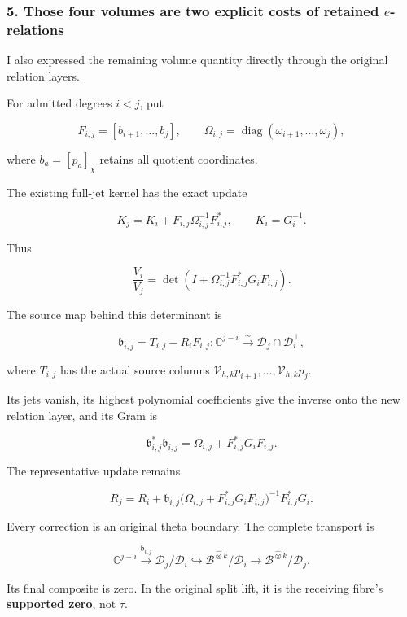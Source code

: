 \subsubsection{\texorpdfstring{5. Those four volumes are two explicit costs of retained \(e\)-relations}{5. Those four volumes are two explicit costs of retained -relations}}\label{endpoint-user_norm_original--those-four-volumes-are-two-explicit-costs-of-retained-e-relations}

I also expressed the remaining volume quantity directly through the original relation layers.

For admitted degrees \(i<j\), put

\[
F_{i,j}=[b_{i+1},\ldots,b_j],
\qquad
\Omega_{i,j}
=
\operatorname{diag}(\omega_{i+1},\ldots,\omega_j),
\]

where \(b_a=[p_a]_\chi\) retains all quotient coordinates.

The existing full-jet kernel has the exact update

\[
K_j=K_i+F_{i,j}\Omega_{i,j}^{-1}F_{i,j}^*,
\qquad K_i=G_i^{-1}.
\]

Thus

\[
\boxed{
\frac{V_i}{V_j}
=
\det\!\left(
I+\Omega_{i,j}^{-1}F_{i,j}^*G_iF_{i,j}
\right).
}
\]

The source map behind this determinant is

\[
\boxed{
\mathfrak b_{i,j}
=
T_{i,j}-R_iF_{i,j}:
\mathbb C^{j-i}
\xrightarrow{\sim}
\mathcal D_j\cap\mathcal D_i^\perp,
}
\]

where \(T_{i,j}\) has the actual source columns \(\mathcal V_{h,k}p_{i+1},\ldots,\mathcal V_{h,k}p_j\).

Its jets vanish, its highest polynomial coefficients give the inverse onto the new relation layer, and its Gram is

\[
\boxed{
\mathfrak b_{i,j}^*\mathfrak b_{i,j}
=
\Omega_{i,j}+F_{i,j}^*G_iF_{i,j}.
}
\]

The representative update remains

\[
\boxed{
R_j
=
R_i+
\mathfrak b_{i,j}
\bigl(\Omega_{i,j}+F_{i,j}^*G_iF_{i,j}\bigr)^{-1}
F_{i,j}^*G_i.
}
\]

Every correction is an original theta boundary. The complete transport is

\[
\mathbb C^{j-i}
\xrightarrow{\mathfrak b_{i,j}}
\mathcal D_j/\mathcal D_i
\hookrightarrow
\mathscr B^{\widehat\otimes k}/\mathcal D_i
\longrightarrow
\mathscr B^{\widehat\otimes k}/\mathcal D_j.
\]

Its final composite is zero. In the original split lift, it is the receiving fibre's \textbf{supported zero}, not \(\tau\).

